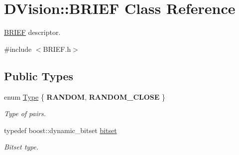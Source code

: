 \hypertarget{classDVision_1_1BRIEF}{}\section{D\+Vision\+:\+:B\+R\+I\+EF Class Reference}
\label{classDVision_1_1BRIEF}


\hyperlink{classDVision_1_1BRIEF}{B\+R\+I\+EF} descriptor.  




{\ttfamily \#include $<$B\+R\+I\+E\+F.\+h$>$}

\subsection*{Public Types}
\begin{DoxyCompactItemize}
\item 
\mbox{\label{classDVision_1_1BRIEF_a0203beaaafe3aca790393cc032eeb499}} 
enum \hyperlink{classDVision_1_1BRIEF_a0203beaaafe3aca790393cc032eeb499}{Type} \{ {\bfseries R\+A\+N\+D\+OM}, 
{\bfseries R\+A\+N\+D\+O\+M\+\_\+\+C\+L\+O\+SE}
 \}\begin{DoxyCompactList}\small\item\em Type of pairs. \end{DoxyCompactList}
\item 
\mbox{\label{classDVision_1_1BRIEF_abc56a095174a93b0741099f35230b7c5}} 
typedef boost\+::dynamic\+\_\+bitset \hyperlink{classDVision_1_1BRIEF_abc56a095174a93b0741099f35230b7c5}{bitset}
\begin{DoxyCompactList}\small\item\em Bitset type. \end{DoxyCompactList}\end{DoxyCompactItemize}
